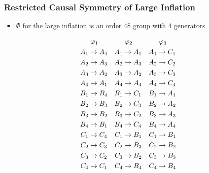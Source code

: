\documentclass[
    hyperref={bookmarks=false},%
    xcolor={dvipsnames},
]{beamer}
\begin{document}
\begin{frame}
    \frametitle{Restricted Causal Symmetry of Large Inflation}
    \begin{itemize}
        \item $\Phi$ for the large inflation is an order $48$ group with $4$ generators
    \end{itemize}
    \begin{equation*}
    \begin{aligned}[c]
    &\hspace{1mm}\gep_1 \\
    A_1 &\to A_4 \\A_2 &\to A_3 \\A_3 &\to A_2 \\A_4 &\to A_1 \\B_1 &\to B_4 \\B_2 &\to B_3 \\B_3 &\to B_2 \\B_4 &\to B_1 \\C_1 &\to C_4 \\C_2 &\to C_3 \\C_3 &\to C_2 \\C_4 &\to C_1
    \end{aligned}
    \quad
    \begin{aligned}[c]
    &\hspace{1mm}\gep_2 \\
    A_1 &\to A_1 \\A_2 &\to A_3 \\A_3 &\to A_2 \\A_4 &\to A_4 \\B_1 &\to C_1 \\B_2 &\to C_3 \\B_3 &\to C_2 \\B_4 &\to C_4 \\C_1 &\to B_1 \\C_2 &\to B_3 \\C_3 &\to B_2 \\C_4 &\to B_4
    \end{aligned}
    \quad
    \begin{aligned}[c]
    &\hspace{1mm}\gep_3 \\
    A_1 &\to C_1 \\A_2 &\to C_2 \\A_3 &\to C_3 \\A_4 &\to C_4 \\B_1 &\to A_1 \\B_2 &\to A_2 \\B_3 &\to A_3 \\B_4 &\to A_4 \\C_1 &\to B_1 \\C_2 &\to B_2 \\C_3 &\to B_3 \\C_4 &\to B_4

\end{aligned}
\end{equation*}
\end{frame}
\end{document}
